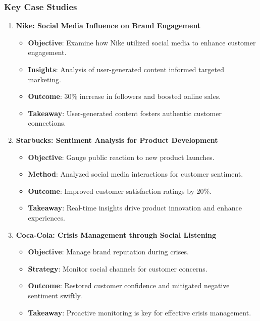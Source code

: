 \documentclass{beamer}
\begin{document}
\begin{frame}[fragile]
    \frametitle{Key Case Studies}
    \begin{enumerate}
        \item \textbf{Nike: Social Media Influence on Brand Engagement}
            \begin{itemize}
                \item \textbf{Objective}: Examine how Nike utilized social media to enhance customer engagement.
                \item \textbf{Insights}: Analysis of user-generated content informed targeted marketing.
                \item \textbf{Outcome}: 30\% increase in followers and boosted online sales.
                \item \textbf{Takeaway}: User-generated content fosters authentic customer connections.
            \end{itemize}
            
        \item \textbf{Starbucks: Sentiment Analysis for Product Development}
            \begin{itemize}
                \item \textbf{Objective}: Gauge public reaction to new product launches.
                \item \textbf{Method}: Analyzed social media interactions for customer sentiment.
                \item \textbf{Outcome}: Improved customer satisfaction ratings by 20\%.
                \item \textbf{Takeaway}: Real-time insights drive product innovation and enhance experiences.
            \end{itemize}

        \item \textbf{Coca-Cola: Crisis Management through Social Listening}
            \begin{itemize}
                \item \textbf{Objective}: Manage brand reputation during crises.
                \item \textbf{Strategy}: Monitor social channels for customer concerns.
                \item \textbf{Outcome}: Restored customer confidence and mitigated negative sentiment swiftly.
                \item \textbf{Takeaway}: Proactive monitoring is key for effective crisis management.
            \end{itemize}
    \end{enumerate}
\end{frame}
\end{document}
